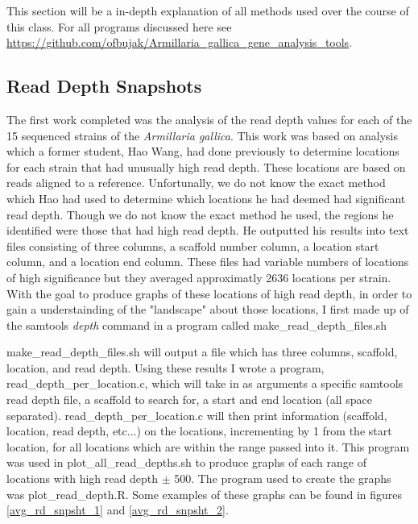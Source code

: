 \documentclass[../main.tex]{subfiles}
\begin{document}
%
%

This section will be a in-depth explanation of all methods used over the course of this class. For all programs discussed here see \url{https://github.com/ofbujak/Armillaria_gallica_gene_analysis_tools}.

\subsection{Read Depth Snapshots}%
	The first work completed was the analysis of the read depth values for each of the 15 sequenced strains of the \textit{Armillaria gallica}. This work was based on analysis which a former student, Hao Wang, had done previously to determine locations for each strain that had unusually high read depth. These locations are based on reads aligned to a reference. Unfortunally, we do not know the exact method which Hao had used to determine which locations he had deemed had significant read depth. Though we do not know the exact method he used, the regions he identified were those that had high read depth. He outputted his results into text files consisting of three columns, a scaffold number column, a location start column, and a location end column. These files had variable numbers of locations of high significance but they averaged approximatly 2636 locations per strain. With the goal to produce graphs of these locations of high read depth, in order to gain a understainding of the "landscape" about those locations, I first made up of the samtools \textit{depth} command in a program called make\_read\_depth\_files.sh

make\_read\_depth\_files.sh will output a file which has three columns, scaffold, location, and read depth. Using these results I wrote a program, read\_depth\_per\_location.c, which will take in as arguments a specific samtools read depth file, a scaffold to search for, a start and end location (all space separated). read\_depth\_per\_location.c will then print information (scaffold, location, read depth, etc...) on the locations, incrementing by 1 from the start location, for all locations which are within the range passed into it. This program was used in plot\_all\_read\_depths.sh to produce graphs of each range of locations with high read depth $\pm$ 500. The program used to create the graphs was plot\_read\_depth.R. Some examples of these graphs can be found in figures \ref{avg_rd_snpsht_1} and \ref{avg_rd_snpsht_2}.
	
\end{document}

